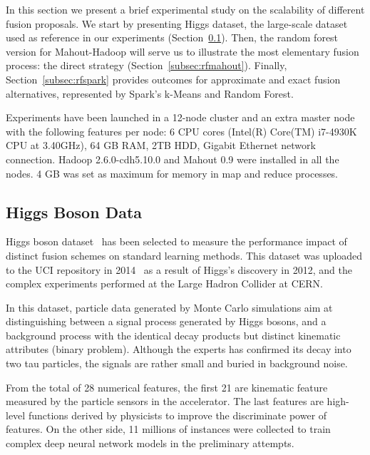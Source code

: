 \documentclass[3p,review]{elsarticle}
\begin{document}
In this section we present a brief experimental study on the scalability of different fusion proposals. We start by presenting Higgs dataset, the large-scale dataset used as reference in our experiments (Section~\ref{subsec:datasets}). Then, the random forest version for Mahout-Hadoop will serve us to illustrate the most elementary fusion process: the direct strategy (Section~\ref{subsec:rfmahout}). Finally, Section~\ref{subsec:rfspark} provides outcomes for approximate and exact fusion alternatives, represented by Spark's k-Means and Random Forest.

Experiments have been launched in a 12-node cluster and an extra master node with the following features per node: 6 CPU cores (Intel(R) Core(TM) i7-4930K CPU at 3.40GHz), 64 GB RAM, 2TB HDD, Gigabit Ethernet network connection. Hadoop 2.6.0-cdh5.10.0 and Mahout 0.9 were installed in all the nodes. 4 GB was set as maximum for memory in map and reduce processes.

\subsection{Higgs Boson Data}
\label{subsec:datasets}

Higgs boson dataset~\cite{baldi14} has been selected to measure the performance impact of distinct fusion schemes on standard learning methods. This dataset was uploaded to the UCI repository in 2014~\cite{Lichman:2013} as a result of Higgs's discovery in 2012, and the complex experiments performed at the Large Hadron Collider at CERN. %

In this dataset, particle data generated by Monte Carlo simulations aim at distinguishing between a signal process generated by Higgs bosons, and a background process with the identical decay products but distinct kinematic attributes (binary problem). Although the experts has confirmed its decay into two tau particles, the signals are rather small and buried in background noise. 

From the total of 28 numerical features, the first 21 are kinematic feature measured by the particle sensors in the accelerator. The last features are high-level functions derived by physicists to improve the discriminate power of features. On the other side, 11 millions of instances were collected to train complex deep neural network models in the preliminary attempts.
\end{document}
